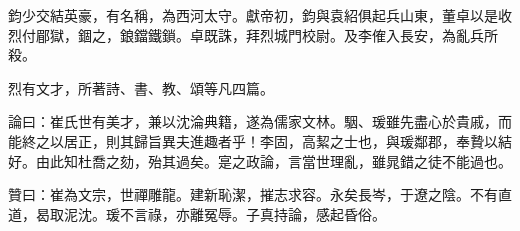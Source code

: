 \begin{pinyinscope}
鈞少交結英豪，有名稱，為西河太守。獻帝初，鈞與袁紹俱起兵山東，董卓以是收烈付郿獄，錮之，鋃鐺鐵鎖。卓既誅，拜烈城門校尉。及李傕入長安，為亂兵所殺。

烈有文才，所著詩、書、教、頌等凡四篇。

論曰：崔氏世有美才，兼以沈淪典籍，遂為儒家文林。駰、瑗雖先盡心於貴戚，而能終之以居正，則其歸旨異夫進趣者乎！李固，高絜之士也，與瑗鄰郡，奉贄以結好。由此知杜喬之劾，殆其過矣。寔之政論，言當世理亂，雖晁錯之徒不能過也。

贊曰：崔為文宗，世禪雕龍。建新恥潔，摧志求容。永矣長岑，于遼之陰。不有直道，曷取泥沈。瑗不言祿，亦離冤辱。子真持論，感起昏俗。


\end{pinyinscope}